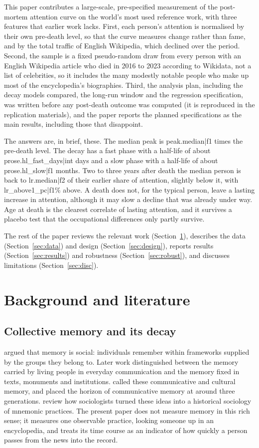 \documentclass[11pt,a4paper]{article}
\begin{document}
This paper contributes a large-scale, pre-specified measurement of the post-mortem attention curve on the world's most used reference work, with three features that earlier work lacks. First, each person's attention is normalised by their own pre-death level, so that the curve measures change rather than fame, and by the total traffic of English Wikipedia, which declined over the period. Second, the sample is a fixed pseudo-random draw from every person with an English Wikipedia article who died in 2016 to 2023 according to Wikidata, not a list of celebrities, so it includes the many modestly notable people who make up most of the encyclopedia's biographies. Third, the analysis plan, including the decay models compared, the long-run window and the regression specification, was written before any post-death outcome was computed (it is reproduced in the replication materials), and the paper reports the planned specifications as the main results, including those that disappoint.

The answers are, in brief, these. The median peak is {{peak.median|f1}} times the pre-death level. The decay has a fast phase with a half-life of about {{prose.hl_fast_days|int}} days and a slow phase with a half-life of about {{prose.hl_slow|f1}} months. Two to three years after death the median person is back to {{lr.median|f2}} of their earlier share of attention, slightly below it, with {{lr_above1_pc|f1}}\% above. A death does not, for the typical person, leave a lasting increase in attention, although it may slow a decline that was already under way. Age at death is the clearest correlate of lasting attention, and it survives a placebo test that the occupational differences only partly survive.

The rest of the paper reviews the relevant work (Section~\ref{sec:lit}), describes the data (Section~\ref{sec:data}) and design (Section~\ref{sec:design}), reports results (Section~\ref{sec:results}) and robustness (Section~\ref{sec:robust}), and discusses limitations (Section~\ref{sec:disc}).

\section{Background and literature}\label{sec:lit}
\subsection{Collective memory and its decay}
\citet{halbwachs1992} argued that memory is social: individuals remember within frameworks supplied by the groups they belong to. Later work distinguished between the memory carried by living people in everyday communication and the memory fixed in texts, monuments and institutions. \citet{assmann1995} called these communicative and cultural memory, and placed the horizon of communicative memory at around three generations. \citet{olick1998} review how sociologists turned these ideas into a historical sociology of mnemonic practices. The present paper does not measure memory in this rich sense; it measures one observable practice, looking someone up in an encyclopedia, and treats its time course as an indicator of how quickly a person passes from the news into the record.
\end{document}
